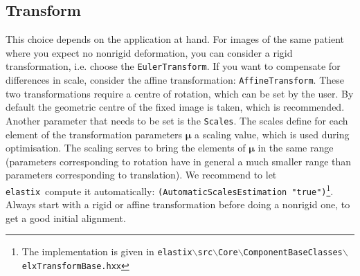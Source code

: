 \documentclass[]{report}
\newcommand{\elastix}{\texttt{elastix}}
\newcommand{\vmu}{\bm{\mu}}
\begin{document}
\subsection{Transform}\label{sec:transformtuning}

This choice depends on the application at hand. For images of the
same patient where you expect no nonrigid deformation, you can
consider a rigid transformation, i.e. choose the
\texttt{EulerTransform}. If you want to compensate for differences
in scale, consider the affine transformation:
\texttt{AffineTransform}. These two transformations require a centre
of rotation, which can be set by the user. By default the geometric
centre of the fixed image is taken, which is recommended. Another
parameter that needs to be set is the \texttt{Scales}. The scales
define for each element of the transformation parameters $\vmu$ a
scaling value, which is used during optimisation. The scaling serves
to bring the elements of $\vmu$ in the same range (parameters
corresponding to rotation have in general a much smaller range than
parameters corresponding to translation). We recommend to let
\elastix\ compute it automatically:
\texttt{(AutomaticScalesEstimation "true")}\footnote{The
implementation is given in
\texttt{elastix$\backslash$src$\backslash$Core$\backslash$ComponentBaseClasses$\backslash$elxTransformBase.hxx}}.
Always start with a rigid or affine transformation before doing a
nonrigid one, to get a good initial alignment.
\end{document}

